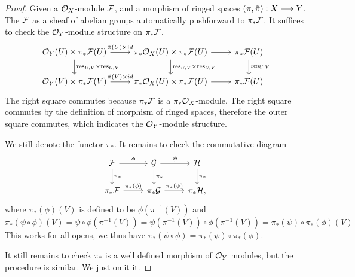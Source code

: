 \documentclass[11pt]{book} %
\begin{document}
\begin{proof}
Given a ${\cal O}_X$-module ${\cal F}$, and  a morphism of ringed spaces $(\pi,\tilde{\pi}):X\longrightarrow Y$. The ${\cal F}$ as a sheaf of abelian groups automatically pushforward to $\pi_*{\cal F}$. It suffices to check the ${\cal O}_Y$-module structure on $\pi_*{\cal F}$.
$$
\begin{tikzcd}
\calo_Y(U)\times\pi_*\calf(U) \arrow[d, "{\res_{U,V}\times\res_{U,V}}"] \arrow[r,"{\tilde{\pi}(U)\times id}"] & \pi_*\calo_{X}(U)\times\pi_*\calf(U) \arrow[d, "{\res_{U,V}\times\res_{U,V}}"]\arrow[r] & \pi_*\calf(U) \arrow[d,"{\res_{U,V}}"] \\
\calo_Y(V)\times\pi_*\calf(V) \arrow[r,"{\tilde{\pi}(V)\times id}"] & \pi_*\calo_{X}(U)\times\pi_*\calf(U) \arrow[r] & \pi_*\calf(U)
\end{tikzcd}
$$
The right square commutes because $\pi_*{\cal F}$ is a $\pi_*{\cal O}_X$-module. The right square commutes by the definition of morphism of ringed spaces, therefore the outer square commutes, which indicates the ${\cal O}_Y$-module structure.

We still denote the functor $\pi_*$. It remains to check the commutative diagram
$$
\begin{tikzcd}
\calf \arrow[d, "\pi_*"] \arrow[r, "\phi"] & \calg \arrow[d, "\pi_*"] \arrow[r, "\psi"] & \calh \arrow[d, "\pi_*"] \\
\pi_*\calf \arrow[r, "\pi_*(\phi)"] & \pi_*\calg \arrow[r, "\pi_*(\psi)"] & \pi_*\calh,
\end{tikzcd}
$$
where $\pi_*(\phi)(V)$ is defined to be $\phi(\pi^{-1}(V))$ and $\pi_*(\psi\circ \phi)(V)=\psi\circ \phi(\pi^{-1}(V))=\psi(\pi^{-1}(V))\circ \phi(\pi^{-1}(V)) =\pi_*(\psi)\circ \pi_*(\phi) (V)$
This works for all opens,  we thus have $\pi_*(\psi\circ \phi)=\pi_*(\psi)\circ \pi_*(\phi)$.

It still remains to check $\pi_*$ is a well defined morphism of ${\cal O}_Y$ modules, but the procedure is similar. We just omit it.
\end{proof}
\end{document}
